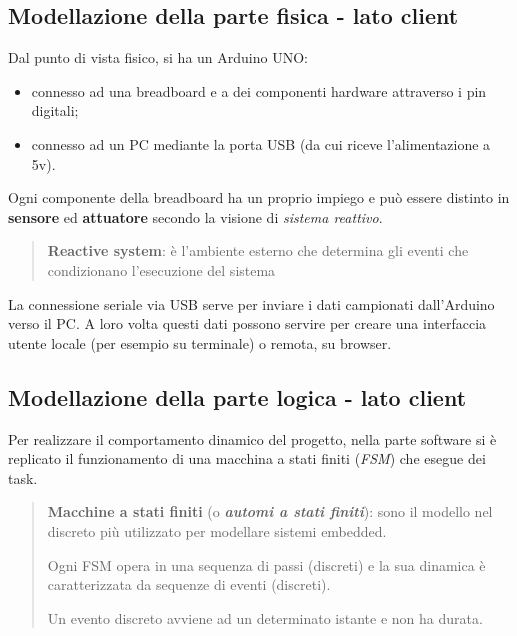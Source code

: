 \subsection{Modellazione della parte fisica - lato client}
Dal punto di vista fisico, si ha un Arduino UNO:
\begin{itemize}
	\item connesso ad una breadboard e a dei componenti hardware attraverso i pin digitali;
	\item connesso ad un PC mediante la porta USB (da cui riceve l'alimentazione a 5v). 
\end{itemize}
Ogni componente della breadboard ha un proprio impiego e può essere distinto in \textbf{sensore} ed \textbf{attuatore} secondo la visione di \textit{sistema reattivo}.
	\begin{quote}
		\textbf{Reactive system}: è l’ambiente esterno che determina gli eventi che	condizionano l’esecuzione del sistema
	\end{quote}	
La connessione seriale via USB serve per inviare i dati campionati dall'Arduino verso il PC. A loro volta questi dati possono servire per creare una interfaccia utente locale (per esempio su terminale) o remota, su browser.

\subsection{Modellazione della parte logica - lato client}
Per realizzare il comportamento dinamico del progetto, nella parte software si è replicato il funzionamento di una macchina a stati finiti (\textit{FSM}) che esegue dei task.

	\begin{quote}
		\textbf{Macchine a stati finiti} (o \textbf{\textit{automi a stati finiti}}): sono il modello nel discreto più utilizzato per modellare sistemi embedded.
		
		Ogni FSM opera in una sequenza di passi (discreti) e la sua dinamica è caratterizzata da sequenze di eventi (discreti).
		
		Un evento discreto avviene ad un determinato istante e non ha durata.
	\end{quote}
	
